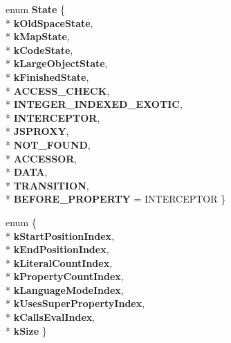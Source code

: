 \begin{DoxyCompactItemize}
\item 
enum {\bfseries State} \{ \\*
{\bfseries k\+Old\+Space\+State}, 
\\*
{\bfseries k\+Map\+State}, 
\\*
{\bfseries k\+Code\+State}, 
\\*
{\bfseries k\+Large\+Object\+State}, 
\\*
{\bfseries k\+Finished\+State}, 
\\*
{\bfseries A\+C\+C\+E\+S\+S\+\_\+\+C\+H\+E\+CK}, 
\\*
{\bfseries I\+N\+T\+E\+G\+E\+R\+\_\+\+I\+N\+D\+E\+X\+E\+D\+\_\+\+E\+X\+O\+T\+IC}, 
\\*
{\bfseries I\+N\+T\+E\+R\+C\+E\+P\+T\+OR}, 
\\*
{\bfseries J\+S\+P\+R\+O\+XY}, 
\\*
{\bfseries N\+O\+T\+\_\+\+F\+O\+U\+ND}, 
\\*
{\bfseries A\+C\+C\+E\+S\+S\+OR}, 
\\*
{\bfseries D\+A\+TA}, 
\\*
{\bfseries T\+R\+A\+N\+S\+I\+T\+I\+ON}, 
\\*
{\bfseries B\+E\+F\+O\+R\+E\+\_\+\+P\+R\+O\+P\+E\+R\+TY} = I\+N\+T\+E\+R\+C\+E\+P\+T\+OR
 \}\hypertarget{classv8_1_1internal_1_1_b_a_s_e___e_m_b_e_d_d_e_d_aea5e836b2c351dd71777783bbf36881f}{}\label{classv8_1_1internal_1_1_b_a_s_e___e_m_b_e_d_d_e_d_aea5e836b2c351dd71777783bbf36881f}

\item 
enum \{ \\*
{\bfseries k\+Start\+Position\+Index}, 
\\*
{\bfseries k\+End\+Position\+Index}, 
\\*
{\bfseries k\+Literal\+Count\+Index}, 
\\*
{\bfseries k\+Property\+Count\+Index}, 
\\*
{\bfseries k\+Language\+Mode\+Index}, 
\\*
{\bfseries k\+Uses\+Super\+Property\+Index}, 
\\*
{\bfseries k\+Calls\+Eval\+Index}, 
\\*
{\bfseries k\+Size}
 \}\hypertarget{classv8_1_1internal_1_1_b_a_s_e___e_m_b_e_d_d_e_d_a94bdc9fef7598240243f8785fdc751c7}{}\label{classv8_1_1internal_1_1_b_a_s_e___e_m_b_e_d_d_e_d_a94bdc9fef7598240243f8785fdc751c7}


\end{DoxyCompactItemize}
